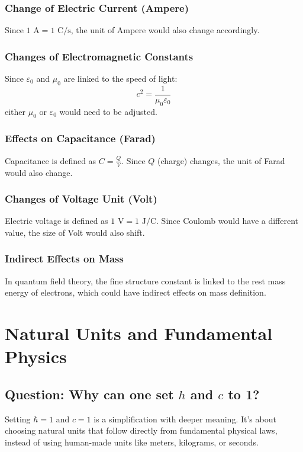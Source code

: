 \documentclass{article}
\begin{document}
\subsubsection{Change of Electric Current (Ampere)}
Since $1 \text{ A} = 1 \text{ C}/\text{s}$, the unit of Ampere would also change accordingly.

\subsubsection{Changes of Electromagnetic Constants}
Since $\varepsilon_0$ and $\mu_0$ are linked to the speed of light:
\begin{equation}
	c^2 = \frac{1}{\mu_0\varepsilon_0}
\end{equation}
either $\mu_0$ or $\varepsilon_0$ would need to be adjusted.

\subsubsection{Effects on Capacitance (Farad)}
Capacitance is defined as $C = \frac{Q}{V}$. Since $Q$ (charge) changes, the unit of Farad would also change.

\subsubsection{Changes of Voltage Unit (Volt)}
Electric voltage is defined as $1 \text{ V} = 1 \text{ J}/\text{C}$. Since Coulomb would have a different value, the size of Volt would also shift.

\subsubsection{Indirect Effects on Mass}
In quantum field theory, the fine structure constant is linked to the rest mass energy of electrons, which could have indirect effects on mass definition.

\section{Natural Units and Fundamental Physics}

\subsection{Question: Why can one set $h$ and $c$ to 1?}

Setting $\hbar = 1$ and $c = 1$ is a simplification with deeper meaning. It's about choosing natural units that follow directly from fundamental physical laws, instead of using human-made units like meters, kilograms, or seconds.
\end{document}
